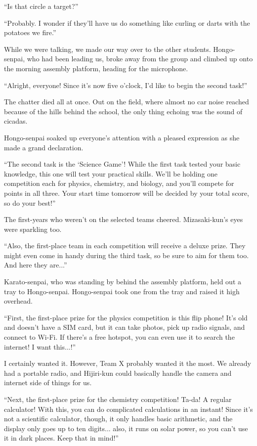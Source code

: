 \documentclass[
    a4paper,
    12pt,
    twoside,
    openany,
    UTF8,
    fontset=windows
]{ctexbook}
\begin{document}
``Is that circle a target?''

``Probably. I wonder if they'll have us do something like curling or darts with the potatoes we fire.''

While we were talking, we made our way over to the other students. Hongo-senpai, who had been leading us, broke away from the group and climbed up onto the morning assembly platform, heading for the microphone.

``Alright, everyone! Since it's now five o'clock, I'd like to begin the second task!''

The chatter died all at once. Out on the field, where almost no car noise reached because of the hills behind the school, the only thing echoing was the sound of cicadas.

Hongo-senpai soaked up everyone's attention with a pleased expression as she made a grand declaration.

``The second task is the `Science Game'! While the first task tested your basic knowledge, this one will test your practical skills. We'll be holding one competition each for physics, chemistry, and biology, and you'll compete for points in all three. Your start time tomorrow will be decided by your total score, so do your best!''

The first-years who weren't on the selected teams cheered. Mizasaki-kun's eyes were sparkling too.

``Also, the first-place team in each competition will receive a deluxe prize. They might even come in handy during the third task, so be sure to aim for them too. And here they are...''

Karato-senpai, who was standing by behind the assembly platform, held out a tray to Hongo-senpai. Hongo-senpai took one from the tray and raised it high overhead.

``First, the first-place prize for the physics competition is this flip phone! It's old and doesn't have a SIM card, but it can take photos, pick up radio signals, and connect to Wi-Fi. If there's a free hotspot, you can even use it to search the internet! I want this...!''

I certainly wanted it. However, Team X probably wanted it the most. We already had a portable radio, and Hijiri-kun could basically handle the camera and internet side of things for us.

``Next, the first-place prize for the chemistry competition! Ta-da! A regular calculator! With this, you can do complicated calculations in an instant! Since it's not a scientific calculator, though, it only handles basic arithmetic, and the display only goes up to ten digits... also, it runs on solar power, so you can't use it in dark places. Keep that in mind!''
\end{document}
